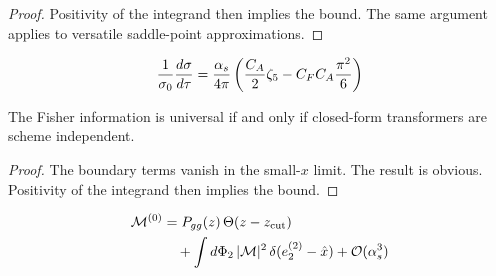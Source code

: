 \begin{proof}
Positivity of the integrand then implies the bound. The same argument
applies to versatile saddle-point approximations.
\end{proof}

\begin{equation}
  \frac{1}{\sigma_0} \frac{d\sigma}{d\tau} = \frac{\alpha_s}{4\pi} \left( \frac{C_A}{2} \zeta_{5} - C_F C_A \frac{\pi^2}{6} \right)
  \label{eq:3}
\end{equation}

\begin{proposition}\label{thm:2}
The Fisher information is universal if and only if closed-form
transformers are scheme independent.
\end{proposition}

\begin{proof}
The boundary terms vanish in the small-$x$ limit. The result is obvious.
Positivity of the integrand then implies the bound.
\end{proof}

\begin{align}
  \mathcal{M}^{(0)} &= P_{gg}(z) \, \Theta(z - z_{\rm cut}) \nonumber \\
  &\quad + \int d\Phi_{2} \, |\mathcal{M}|^2 \, \delta(e_2^{(2)} - \hat{x}) + \mathcal{O}(\alpha_s^3) \label{eq:6}
\end{align}

